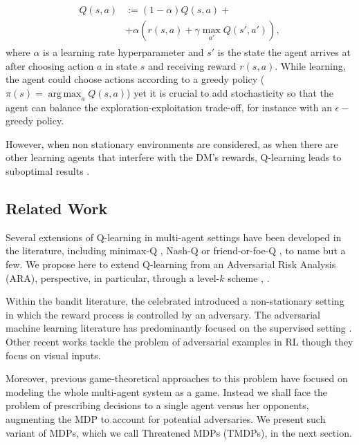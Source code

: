 \documentclass[letterpaper]{article} %
\DeclareMathOperator*{\argmax}{arg\,max}
\begin{document}
\begin{align}\label{eq:ql}
\begin{split}
Q(s,a) &:= (1 - \alpha) Q(s, a)  + \\ &+ \alpha \left(r(s,a) + \gamma\max_{a'} Q(s', a') \right),
\end{split}
\end{align}
where $\alpha$ is a learning rate hyperparameter
and $s'$ is the state the agent arrives at after choosing action $a$ in
state $s$ and receiving reward $r(s,a)$. While learning, the agent
could choose actions according to a greedy policy ($\pi(s) = \argmax_a Q(s, a) $) yet it
is crucial to add stochasticity so that the agent can balance the exploration-exploitation trade-off, for instance with an $\epsilon-$greedy policy.

However, when non stationary environments are considered, as when there are other
learning agents that interfere with the DM's rewards, Q-learning leads
to suboptimal results \cite{marl_over}.


\subsection{Related Work}


Several extensions of Q-learning in multi-agent settings have been developed
in the literature, including minimax-Q \cite{littman1994markov},
Nash-Q \cite{hu2003nash} or friend-or-foe-Q \cite{littman2001friend},
to name but a few.
We propose here to extend Q-learning from an Adversarial Risk Analysis (ARA),
\cite{rios2009adversarial} perspective, in particular, through
a level-$k$ scheme \cite{stahl1994experimental}, \cite{stahl1995players}.

Within the bandit literature, the celebrated \cite{auer1995gambling} introduced
a non-stationary setting in which the reward process is controlled by an adversary.
The adversarial machine learning literature has predominantly focused on the supervised setting \cite{biggio2017wild}.
Other recent works tackle the problem of adversarial examples in RL \cite{huang2017adversarial,lin2017tactics} though they focus on visual inputs.

Moreover, previous game-theoretical approaches to this problem have focused on modeling the whole multi-agent system as a game. Instead we shall face the problem of prescribing decisions to a single agent
versus her opponents, augmenting the MDP to account for potential adversaries. We present such variant of MDPs,
which we call Threatened MDPs (TMDPs), in the next section.
\end{document}
